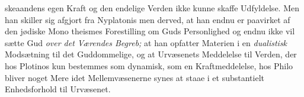 skeaandens egen Kraft og den endelige Verden ikke kunne
skaffe Udfyldelse. Men han skiller sig afgjort fra Nyplatonis\-%
men derved, at han endnu er paavirket af den jødiske Mono\-%
theismes Forestilling om Guds Personlighed og endnu ikke vil
sætte Gud \emph{over det Værendes Begreb;} at han opfatter
Materien i en \emph{dualistisk} Modsætning til det Guddommelige,
og at Urvæsenets Meddelelse til Verden, der hos Plotinos kun
bestemmes som dynamisk, som en Kraftmeddelelse, hos Philo
 \setcounter{footnote}{0}
bliver noget Mere idet Mellemvæsenerne synes at staae i
et substantielt Enhedsforhold til Urvæsenet.

